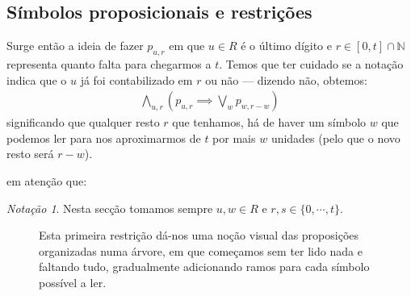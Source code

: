 \documentclass[a4paper,12pt]{article}
\theoremstyle{definition}
\theoremstyle{theorem}
\theoremstyle{remark}
\newtheorem{notç}[defn]{Notação}
\newcommand{\seta}{\draw[-{>[scale=2,width=2]},line width=0.5pt]}
\begin{document}
\subsection{Símbolos proposicionais e restrições}
Surge então a ideia de fazer $p_{u,r}$ em que $u\in R$ é o último dígito e
$r\in [0,t]\cap\mathbb N$ representa quanto falta para chegarmos a $t$.
Temos que ter cuidado se a notação indica que o $u$ já foi contabilizado em $r$
ou não \---- dizendo não, obtemos:
\begin{align}
   \bigwedge_{u,r}\left( p_{u,r}
   \implies
   \bigvee_{w}p_{w,r-w}
   \right)
\end{align}
significando que qualquer resto $r$ que tenhamos, há de haver um símbolo $w$
que podemos ler para nos aproximarmos de $t$ por mais $w$ unidades (pelo que o
novo resto será $r-w$).

em atenção que:
\begin{notç}
   Nesta secção tomamos sempre $u,w\in R$ e $r,s\in\{0,\cdots,t\}$.
\end{notç}


\begin{figure}[h]
\begin{minipage}{0.4\textwidth}
   \centering
\end{minipage}
\hfill
\begin{minipage}{0.4\textwidth}
   Esta primeira restrição dá-nos uma noção visual das proposições organizadas
   numa árvore, em que começamos sem ter lido nada e faltando tudo,
   gradualmente adicionando ramos para cada símbolo possível a ler.
\end{minipage}
\end{figure}
\end{document}
